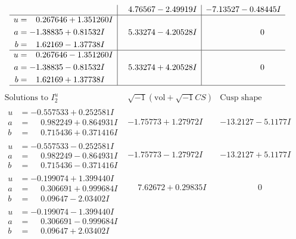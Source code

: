 \documentclass[1p]{elsarticle_modified}
\theoremstyle{definition}
\newcommand{\I}{\sqrt{-1}}
\begin{document}
$$\begin{array}{c|c|c}
 & \phantom{-}4.76567 - 2.49919 I & -7.13527 - 0.48445 I \\ \hline\begin{aligned}
u &= \phantom{-}0.267646 + 1.351260 I \\
a &= -1.38835 + 0.81532 I \\
b &= \phantom{-}1.62169 - 1.37738 I\end{aligned}
 & \phantom{-}5.33274 - 4.20528 I & \phantom{-0.000000 } 0 \\ \hline\begin{aligned}
u &= \phantom{-}0.267646 - 1.351260 I \\
a &= -1.38835 - 0.81532 I \\
b &= \phantom{-}1.62169 + 1.37738 I\end{aligned}
 & \phantom{-}5.33274 + 4.20528 I & \phantom{-0.000000 } 0\\
 \hline 
 \end{array}$$\newpage$$\begin{array}{c|c|c}  
\text{Solutions to }I^u_{2}& \I (\text{vol} + \sqrt{-1}CS) & \text{Cusp shape}\\
 \hline 
\begin{aligned}
u &= -0.557533 + 0.252581 I \\
a &= \phantom{-}0.982249 + 0.864931 I \\
b &= \phantom{-}0.715436 + 0.371416 I\end{aligned}
 & -1.75773 + 1.27972 I & -13.2127 - 5.1177 I \\ \hline\begin{aligned}
u &= -0.557533 - 0.252581 I \\
a &= \phantom{-}0.982249 - 0.864931 I \\
b &= \phantom{-}0.715436 - 0.371416 I\end{aligned}
 & -1.75773 - 1.27972 I & -13.2127 + 5.1177 I \\ \hline\begin{aligned}
u &= -0.199074 + 1.399440 I \\
a &= \phantom{-}0.306691 + 0.999684 I \\
b &= \phantom{-}0.09647 - 2.03402 I\end{aligned}
 & \phantom{-}7.62672 + 0.29835 I & \phantom{-0.000000 } 0 \\ \hline\begin{aligned}
u &= -0.199074 - 1.399440 I \\
a &= \phantom{-}0.306691 - 0.999684 I \\
b &= \phantom{-}0.09647 + 2.03402 I\end{aligned}

\end{array}$$
\end{document}
